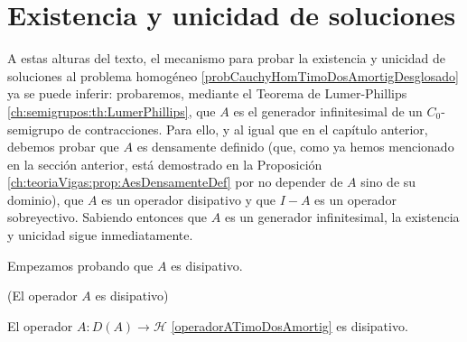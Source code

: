 \section{Existencia y unicidad de soluciones}
\label{ch:TimoshenkoFric:section:existUnicidad}

A estas alturas del texto, el mecanismo para probar la existencia y unicidad de soluciones al problema homogéneo \eqref{probCauchyHomTimoDosAmortigDesglosado} ya se puede inferir: probaremos, mediante el Teorema de Lumer-Phillips \eqref{ch:semigrupos:th:LumerPhillips}, que $A$ es el generador infinitesimal de un $C_0$-semigrupo de contracciones. Para ello, y al igual que en el capítulo anterior, debemos probar que $A$ es densamente definido (que, como ya hemos mencionado en la sección anterior, está demostrado en la Proposición \eqref{ch:teoriaVigas:prop:AesDensamenteDef} por no depender de $A$ sino de su dominio), que $A$ es un operador disipativo y que $I-A$ es un operador sobreyectivo. Sabiendo entonces que $A$ es un generador infinitesimal, la existencia y unicidad sigue inmediatamente.

Empezamos probando que $A$ es disipativo.

\begin{Proposicion}{(El operador $A$ es disipativo)}
    \label{ch:TimoshenkoFric:prop:AesDisipativo}

    El operador $A : D(A) \rightarrow \mathcal{H}$ \eqref{operadorATimoDosAmortig} es disipativo.
\end{Proposicion}

